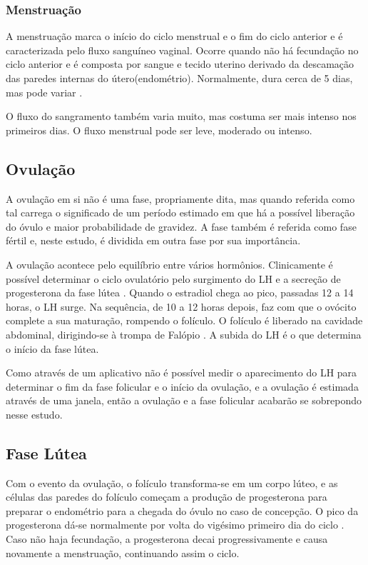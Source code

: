 \subsubsection{Menstruação}

A menstruação marca o início do ciclo menstrual e o fim do ciclo anterior 
e é caracterizada pelo fluxo sanguíneo vaginal. Ocorre quando não há 
fecundação no ciclo anterior e é composta por sangue e tecido uterino 
derivado da descamação das paredes internas do útero(endométrio). 
Normalmente, dura cerca de 5 dias, mas pode variar \cite{guyton2012}.

O fluxo do sangramento também varia muito, mas costuma ser mais intenso nos primeiros dias. O fluxo menstrual pode ser leve, moderado ou intenso.

\subsection{Ovulação}

A ovulação em si não é uma fase, propriamente dita, mas quando referida 
como tal carrega o significado de um período estimado em que há a 
possível liberação do óvulo e maior probabilidade de gravidez. 
A fase também é referida como fase fértil e, neste estudo, é dividida em 
outra fase por sua importância.

A ovulação acontece pelo equilíbrio entre vários hormônios. 
Clinicamente é possível determinar o ciclo ovulatório pelo surgimento do 
LH e a secreção de progesterona da fase lútea \cite{fritz2010}. 
Quando o estradiol chega ao pico, passadas 12 a 14 horas, o LH surge. 
Na sequência, de 10 a 12 horas depois, faz com que o ovócito complete a 
sua maturação, rompendo o folículo. O folículo é liberado na cavidade 
abdominal, dirigindo-se à trompa de Falópio \cite{fritz2010}. 
A subida do LH é o que determina o início da fase lútea.

Como através de um aplicativo não é possível medir o aparecimento do LH 
para determinar o fim da fase folicular e o início da ovulação, 
e a ovulação é estimada através de uma janela, então a ovulação e a fase 
folicular acabarão se sobrepondo nesse estudo.

\subsection{Fase Lútea}

Com o evento da ovulação, o folículo transforma-se em um corpo lúteo, e as 
células das paredes do folículo começam a produção de progesterona para 
preparar o endométrio para a chegada do óvulo no caso de concepção. 
O pico da progesterona dá-se normalmente por volta do vigésimo primeiro 
dia do ciclo \cite{nikas2003}. Caso não haja fecundação, a progesterona 
decai progressivamente e causa novamente a menstruação, continuando assim 
o ciclo.

